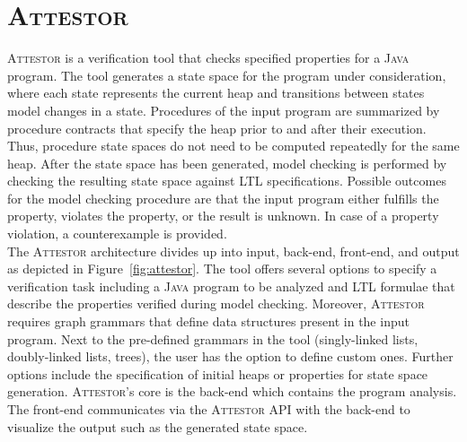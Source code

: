 \documentclass[a4paper, 12pt, twoside]{report}
\begin{document}
	\section{\textsc{Attestor}}\label{sec:attestor}
	
	\textsc{Attestor} is a verification tool that checks specified properties for a \textsc{Java} program. The tool generates a state space for the program under consideration, where each state represents the current heap and transitions between states model changes in a state. Procedures of the input program are summarized by procedure contracts that specify the heap prior to and after their execution. Thus, procedure state spaces do not need to be computed repeatedly for the same heap. After the state space has been generated, model checking is performed by checking the resulting state space against LTL specifications. Possible outcomes for the model checking procedure are that the input program either fulfills the property, violates the property, or the result is unknown. In case of a property violation, a counterexample is provided.\\
	
	The \textsc{Attestor} architecture divides up into input, back-end, front-end, and output as depicted in Figure~\ref{fig:attestor}. The tool offers several options to specify a verification task including a \textsc{Java} program to be analyzed and LTL formulae that describe the properties verified during model checking. Moreover, \textsc{Attestor} requires graph grammars that define data structures present in the input program. Next to the pre-defined grammars in the tool (singly-linked lists, doubly-linked lists, trees), the user has the option to define custom ones. Further options include the specification of initial heaps or properties for state space generation. \textsc{Attestor}'s core is the back-end which contains the program analysis. The front-end communicates via the \textsc{Attestor} API with the back-end to visualize the output such as the generated state space.\\	
	
\end{document}
